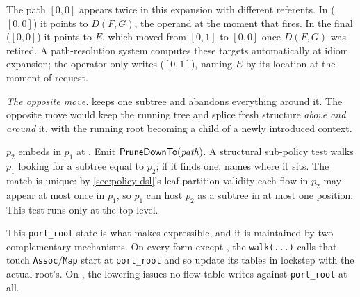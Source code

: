 The path \([0,0]\) appears twice in this expansion with different referents.
In \Retire(\([0,0]\)) it points to \(D(F, G)\), the operand at the moment that \Retire{} fires.
In the final \ChangeRoot(\([0,0]\)) it points to \(E\), which moved from \([0,1]\) to \([0,0]\) once \(D(F, G)\) was retired.
A path-resolution system computes these targets automatically at idiom expansion; the operator only writes \PruneDownTo(\([0,1]\)), naming \(E\) by its location at the moment of request.



\emph{The opposite move.}
\PruneDownTo{} keeps one subtree and abandons everything around it.
The opposite move would keep the running tree and splice fresh structure \emph{above and around} it, with the running root becoming a child of a newly introduced context.



\item \(p_2\) embeds in \(p_1\) at \pth. Emit \(\textsf{PruneDownTo}(\mathit{path})\).
A structural sub-policy test walks \(p_1\) looking for a subtree equal to \(p_2\); if it finds one, \pth names where it sits.
The match is unique: by \cref{sec:policy-dsl}'s leaf-partition validity each flow in \(p_2\) may appear at most once in \(p_1\), so \(p_1\) can host \(p_2\) as a subtree in at most one position.
This test runs only at the top level.



This \texttt{port\_root} state is what makes \ChangeRoot{} expressible, and it is maintained by two complementary mechanisms.
On every form except \ChangeRoot, the \texttt{walk(...)} calls that touch \texttt{Assoc}/\texttt{Map} start at \texttt{port\_root} and so update its tables in lockstep with the actual root's.
On \ChangeRoot, the lowering issues no flow-table writes against \texttt{port\_root} at all.


